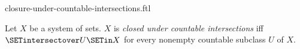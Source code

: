 \documentclass{naproche-library}
\begin{document}
\begin{smodule}[title=Closure Under Countable Intersections]{closure-under-countable-intersections.ftl}

\begin{definition}[forthel,id=FOUNDATIONS_14_451771879129088]
  Let $X$ be a system of sets.
  $X$ is \emph{closed under countable intersections} iff $\SETintersectover U \SETin X$ for every nonempty countable subclass $U$ of $X$.
\end{definition}
\end{smodule}
\end{document}
